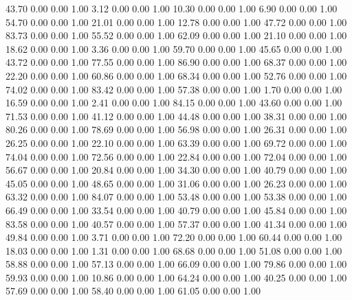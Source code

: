    43.70   0.00   0.00   1.00
    3.12   0.00   0.00   1.00
   10.30   0.00   0.00   1.00
    6.90   0.00   0.00   1.00
   54.70   0.00   0.00   1.00
   21.01   0.00   0.00   1.00
   12.78   0.00   0.00   1.00
   47.72   0.00   0.00   1.00
   83.73   0.00   0.00   1.00
   55.52   0.00   0.00   1.00
   62.09   0.00   0.00   1.00
   21.10   0.00   0.00   1.00
   18.62   0.00   0.00   1.00
    3.36   0.00   0.00   1.00
   59.70   0.00   0.00   1.00
   45.65   0.00   0.00   1.00
   43.72   0.00   0.00   1.00
   77.55   0.00   0.00   1.00
   86.90   0.00   0.00   1.00
   68.37   0.00   0.00   1.00
   22.20   0.00   0.00   1.00
   60.86   0.00   0.00   1.00
   68.34   0.00   0.00   1.00
   52.76   0.00   0.00   1.00
   74.02   0.00   0.00   1.00
   83.42   0.00   0.00   1.00
   57.38   0.00   0.00   1.00
    1.70   0.00   0.00   1.00
   16.59   0.00   0.00   1.00
    2.41   0.00   0.00   1.00
   84.15   0.00   0.00   1.00
   43.60   0.00   0.00   1.00
   71.53   0.00   0.00   1.00
   41.12   0.00   0.00   1.00
   44.48   0.00   0.00   1.00
   38.31   0.00   0.00   1.00
   80.26   0.00   0.00   1.00
   78.69   0.00   0.00   1.00
   56.98   0.00   0.00   1.00
   26.31   0.00   0.00   1.00
   26.25   0.00   0.00   1.00
   22.10   0.00   0.00   1.00
   63.39   0.00   0.00   1.00
   69.72   0.00   0.00   1.00
   74.04   0.00   0.00   1.00
   72.56   0.00   0.00   1.00
   22.84   0.00   0.00   1.00
   72.04   0.00   0.00   1.00
   56.67   0.00   0.00   1.00
   20.84   0.00   0.00   1.00
   34.30   0.00   0.00   1.00
   40.79   0.00   0.00   1.00
   45.05   0.00   0.00   1.00
   48.65   0.00   0.00   1.00
   31.06   0.00   0.00   1.00
   26.23   0.00   0.00   1.00
   63.32   0.00   0.00   1.00
   84.07   0.00   0.00   1.00
   53.48   0.00   0.00   1.00
   53.38   0.00   0.00   1.00
   66.49   0.00   0.00   1.00
   33.54   0.00   0.00   1.00
   40.79   0.00   0.00   1.00
   45.84   0.00   0.00   1.00
   83.58   0.00   0.00   1.00
   40.57   0.00   0.00   1.00
   57.37   0.00   0.00   1.00
   41.34   0.00   0.00   1.00
   49.84   0.00   0.00   1.00
    3.71   0.00   0.00   1.00
   72.20   0.00   0.00   1.00
   60.44   0.00   0.00   1.00
   18.03   0.00   0.00   1.00
    1.31   0.00   0.00   1.00
   68.68   0.00   0.00   1.00
   51.08   0.00   0.00   1.00
   58.88   0.00   0.00   1.00
   57.13   0.00   0.00   1.00
   66.09   0.00   0.00   1.00
   79.86   0.00   0.00   1.00
   59.93   0.00   0.00   1.00
   10.86   0.00   0.00   1.00
   64.24   0.00   0.00   1.00
   40.25   0.00   0.00   1.00
   57.69   0.00   0.00   1.00
   58.40   0.00   0.00   1.00
   61.05   0.00   0.00   1.00
